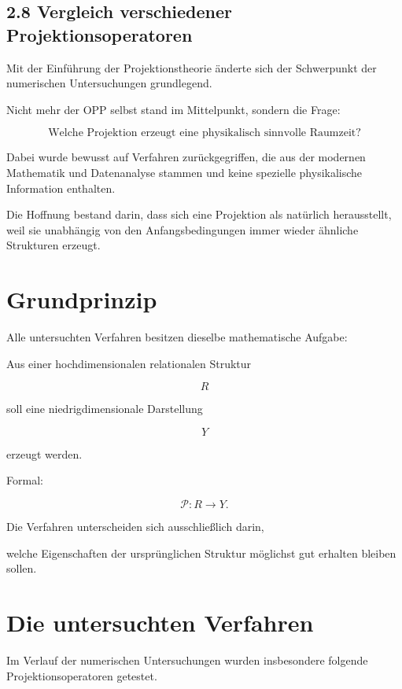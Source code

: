 \subsection{2.8 Vergleich verschiedener Projektionsoperatoren}

Mit der Einführung der Projektionstheorie änderte sich der Schwerpunkt der numerischen Untersuchungen grundlegend.

Nicht mehr der OPP selbst stand im Mittelpunkt, sondern die Frage:

\[
\boxed{
\text{Welche Projektion erzeugt eine physikalisch sinnvolle Raumzeit?}
}
\]

Dabei wurde bewusst auf Verfahren zurückgegriffen, die aus der modernen Mathematik und Datenanalyse stammen und keine spezielle physikalische Information enthalten.

Die Hoffnung bestand darin, dass sich eine Projektion als natürlich herausstellt, weil sie unabhängig von den Anfangsbedingungen immer wieder ähnliche Strukturen erzeugt.


\section*{Grundprinzip}

Alle untersuchten Verfahren besitzen dieselbe mathematische Aufgabe:

Aus einer hochdimensionalen relationalen Struktur

\[
R
\]

soll eine niedrigdimensionale Darstellung

\[
Y
\]

erzeugt werden.

Formal:

\[
\mathcal{P}
:
R
\rightarrow
Y.
\]

Die Verfahren unterscheiden sich ausschließlich darin,

welche Eigenschaften der ursprünglichen Struktur möglichst gut erhalten bleiben sollen.


\section*{Die untersuchten Verfahren}

Im Verlauf der numerischen Untersuchungen wurden insbesondere folgende Projektionsoperatoren getestet.

